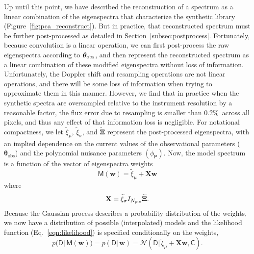 \documentclass[iop,floatfix,numberedappendix,twocolappendix]{emulateapj}
\newcommand{\vt}{ {\bm \theta}}
\begin{document}
Up until this point, we have described the reconstruction of a spectrum as a linear combination of 
the eigenspectra that characterize the synthetic library (Figure~\ref{fig:pca_reconstruct}).  But 
in practice, that reconstructed spectrum must be further post-processed as detailed in 
Section~\ref{subsec:postprocess}.  Fortunately, because convolution is a linear operation, we can 
first post-process the raw eigenspectra according to $\vt_{\rm obs}$, and then represent the 
reconstructed spectrum as a linear combination of these modified eigenspectra without loss of 
information.  Unfortunately, the Doppler shift and resampling operations are not linear operations, 
and there will be some loss of information when trying to approximate them in this manner.  
However, we find that in practice when the synthetic spectra are oversampled relative to the 
instrument resolution by a reasonable factor, the flux error due to resampling is smaller than 
0.2\%\ across all pixels, and thus any effect of that information loss is negligible.  For 
notational compactness, we let $\widetilde{\xi}_\mu$, $\widetilde{\xi}_\sigma$, and 
$\widetilde{\mathbf{\Xi}}$ represent the post-processed eigenspectra, with an implied dependence on 
the current values of the observational parameters ($\vt_\textrm{obs}$) and the polynomial nuisance 
parameters $(\phi_\mathsf{P})$.  Now, the model spectrum is a function of the vector of 
eigenspectra weights  
\begin{equation}
  \mathsf{M}(\mathbf{w}) = \widetilde{\xi}_\mu + \mathbf{X} \mathbf{w}
\end{equation}
where 
\begin{equation}
  \mathbf{X} = \widetilde{\xi}_\sigma I_{N_{\rm pix}} \widetilde{\mathbf{\Xi}}.
\end{equation}
Because the Gaussian process describes a probability distribution of the weights, we now have a
distribution of possible (interpolated) models and the likelihood function
(Eq.~\ref{eqn:likelihood}) is specified conditionally on the weights,
\begin{equation}
  p \bigl( \mathsf{D} |\, \mathsf{M}(\mathbf{w}) \bigr) = p( \mathsf{D} |\, \mathbf{w}) = 
  \mathcal{N} \left ( \mathsf{D} |\, \widetilde{\xi}_\mu + \mathbf{X} \mathbf{w} , \mathsf{C} \right ).
  \label{eqn:likelihood_conditional}
\end{equation}
\end{document}
